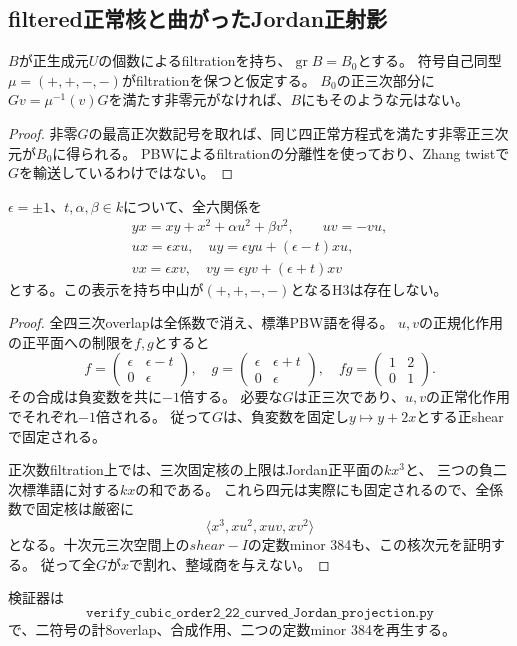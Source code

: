 \subsection{filtered正常核と曲がったJordan正射影}
\label{subsec:h3-order2-22-curved-Jordan-projection}
\begin{lemma}[filtered正常核の消滅]
\label{lem:h3-order2-22-filtered-normal-exclusion}
$B$が正生成元$U$の個数によるfiltrationを持ち、$\operatorname{gr}B=B_0$とする。
符号自己同型$\mu=(+,+,-,-)$がfiltrationを保つと仮定する。
$B_0$の正三次部分に$Gv=\mu^{-1}(v)G$を満たす非零元がなければ、$B$にもそのような元はない。
\end{lemma}
\begin{proof}
非零$G$の最高正次数記号を取れば、同じ四正常方程式を満たす非零正三次元が$B_0$に得られる。
PBWによるfiltrationの分離性を使っており、Zhang twistで$G$を輸送しているわけではない。
\end{proof}

\begin{proposition}\label{prop:h3-order2-22-curved-Jordan-projection-empty}
$\epsilon=\pm1$、$t,\alpha,\beta\in k$について、全六関係を
\begin{gather*}
 yx=xy+x^2+\alpha u^2+\beta v^2,\qquad uv=-vu,\\
 ux=\epsilon xu,\quad uy=\epsilon yu+(\epsilon-t)xu,\\
 vx=\epsilon xv,\quad vy=\epsilon yv+(\epsilon+t)xv
\end{gather*}
とする。この表示を持ち中山が$(+,+,-,-)$となるH3は存在しない。
\end{proposition}
\begin{proof}
全四三次overlapは全係数で消え、標準PBW語を得る。
$u,v$の正規化作用の正平面への制限を$f,g$とすると
\[
 f=\begin{pmatrix}\epsilon&\epsilon-t\\0&\epsilon\end{pmatrix},\quad
 g=\begin{pmatrix}\epsilon&\epsilon+t\\0&\epsilon\end{pmatrix},\quad
 fg=\begin{pmatrix}1&2\\0&1\end{pmatrix}.
\]
その合成は負変数を共に$-1$倍する。
必要な$G$は正三次であり、$u,v$の正常化作用でそれぞれ$-1$倍される。
従って$G$は、負変数を固定し$y\mapsto y+2x$とする正shearで固定される。

正次数filtration上では、三次固定核の上限はJordan正平面の$kx^3$と、
三つの負二次標準語に対する$kx$の和である。
これら四元は実際にも固定されるので、全係数で固定核は厳密に
\[
 \langle x^3,xu^2,xuv,xv^2\rangle
\]
となる。十次元三次空間上の$shear-I$の定数minor 384も、この核次元を証明する。
従って全$G$が$x$で割れ、整域商を与えない。
\end{proof}

検証器は
\[
 \texttt{verify\_cubic\_order2\_22\_curved\_Jordan\_projection.py}
\]
で、二符号の計8overlap、合成作用、二つの定数minor 384を再生する。
